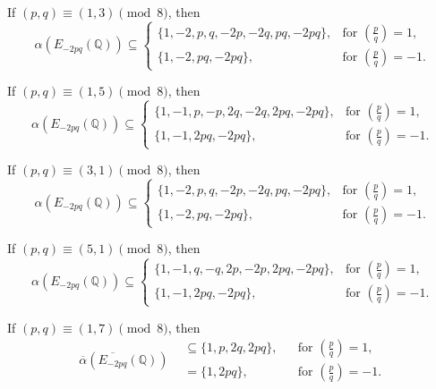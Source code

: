 \documentclass[10pt,a4paper]{amsart}
\newcommand{\bbQ}{\mathbb{Q}}
\newcommand{\legendre}[2]{\genfrac{(}{)}{}{}{#1}{#2}}
\begin{document}
\begin{lem}
\label{lem:alpha_case_2.1}
If $(p,q)\equiv (1,3)\pmod 8$, then
\[
\alpha\left(E_{-2pq}(\bbQ)\right)\subseteq
\begin{cases}
\{1,-2,p,q,-2p,-2q,pq,-2pq\},
& \text{for } \legendre{p}{q}=1,\\
\{1,-2,pq,-2pq\},
& \text{for } \legendre{p}{q}=-1.
\end{cases}
\]
\end{lem}

\begin{lem}
\label{lem:alpha_case_2.2}
If $(p,q)\equiv (1,5)\pmod 8$, then
\[
\alpha\left(E_{-2pq}(\bbQ)\right)\subseteq
\begin{cases}
\{1,-1,p,-p,2q,-2q,2pq,-2pq\},
& \text{for } \legendre{p}{q}=1,\\
\{1,-1,2pq,-2pq\},
& \text{for } \legendre{p}{q}=-1.
\end{cases}
\]
\end{lem}

\begin{lem}
\label{lem:alpha_case_3.1}
If $(p,q)\equiv (3,1)\pmod 8$, then
\[
\alpha\left(E_{-2pq}(\bbQ)\right)\subseteq
\begin{cases}
\{1,-2,p,q,-2p,-2q,pq,-2pq\},
& \text{for } \legendre{p}{q}=1,\\
\{1,-2,pq,-2pq\},
& \text{for } \legendre{p}{q}=-1.
\end{cases}
\]
\end{lem}

\begin{lem}
\label{lem:alpha_case_3.3}
If $(p,q)\equiv (5,1)\pmod 8$, then
\[
\alpha\left(E_{-2pq}(\bbQ)\right)\subseteq
\begin{cases}
\{1,-1,q,-q,2p,-2p,2pq,-2pq\},
& \text{for } \legendre{p}{q}=1,\\
\{1,-1,2pq,-2pq\},
& \text{for } \legendre{p}{q}=-1.
\end{cases}
\]
\end{lem}

\begin{lem}
\label{lem:oalpha_1.2} 
If $(p,q)\equiv (1,7)\pmod 8$, then
\[
\overline{\alpha}\left(\overline{E_{-2pq}}(\bbQ)\right)
\begin{aligned}
    &\subseteq \{1,p,2q,2pq\},
&& \text{for } \legendre{p}{q}=1,\\
&= \{1,2pq\},
&& \text{for } \legendre{p}{q}=-1.
\end{aligned}
\]
\end{lem}
\end{document}
